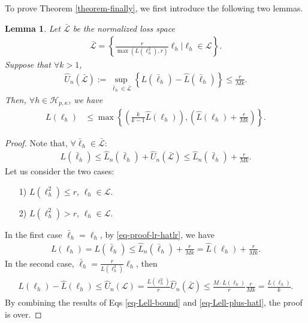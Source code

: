 \documentclass{article}
\newtheorem{lemma}{Lemma}
\begin{document}
To prove Theorem \ref{theorem-finally}, we first introduce the following two lemmas.
\begin{lemma}
\label{the-ori-bound}
   Let $\bar{\mathcal{L}}$ be the normalized loss space
  \begin{align}
    \label{eq-ell-r}
    \bar{\mathcal{L}}=\left\{
        \frac{r}{\max(L(\ell_h^2),r)}\ell_h\Big| \ell_h\in \mathcal{L}
    \right\}.
  \end{align}
   Suppose that $\forall k>1$,
   \begin{align*}
     \hat{U}_n({\bar{\mathcal{L}}})
     :=\sup_{\bar{\ell}_h\in\bar{\mathcal{L}}}\left\{L(\bar{\ell}_h)-\hat{L}(\bar{\ell}_h)\right\}
     \leq \frac{r}{Mk}.
   \end{align*}
   Then, $\forall h\in\mathcal{H}_{p,\kappa}$, we have
   \begin{align*}
     L(\ell_h)&\leq \max\left\{
        \left(\frac{k}{k-1}\hat{L}(\ell_h)
        \right),
        \left(\hat{L}(\ell_h)+\frac{r}{Mk}
        \right)
     \right\}.
   \end{align*}
\end{lemma}
\begin{proof}
  Note that, $\forall \bar{\ell}_h\in{\bar{\mathcal{L}}}$:
  \begin{align}
    \label{eq-proof-lr-hatlr}
    L(\bar{\ell}_h)\leq \hat{L}_{n}(\bar{\ell}_h)
    +\hat{U}_n({\bar{\mathcal{L}}})\leq \hat{L}_n(\bar{\ell}_h)+\frac{r}{Mk}.
  \end{align}
  Let us consider the two cases:
  \begin{itemize}
    \item[1)] $L(\ell_h^2)\leq r$, $\ell_h\in\mathcal{L}$.
    \item[2)] $L(\ell_h^2)>r$, $\ell_h\in\mathcal{L}$.
  \end{itemize}
  In the first case $\bar{\ell}_h=\ell_h$,
  by \eqref{eq-proof-lr-hatlr},
  we have
  \begin{align}
    \label{eq-Lell-bound}
    L(\ell_h)=L(\bar{\ell}_h)\leq \hat{L}_n(\bar{\ell}_h)+\frac{r}{Mk}
    =\hat{L}(\ell_h)+\frac{r}{Mk}.
  \end{align}
  In the second case, $\bar{\ell}_h=\frac{r}{L(\ell_h^2)}\ell_h$,
  then
  \begin{align}
    \label{eq-Lell-plus-hatl}
    \begin{aligned}
    L(\ell_h)-\hat{L}(\ell_h)
    \leq \hat{U}_n(\mathcal{L})
    =\frac{L(\ell_h^2)}{r}\hat{U}_n(\bar{\mathcal{L}})
    \leq\frac{M\cdot L(\ell_h)}{r}\frac{r}{Mk}=\frac{L(\ell_h)}{k}.
    \end{aligned}
  \end{align}
  By combining the results of Eqs \eqref{eq-Lell-bound} and \eqref{eq-Lell-plus-hatl},
  the proof is over.
\end{proof}
\end{document}
